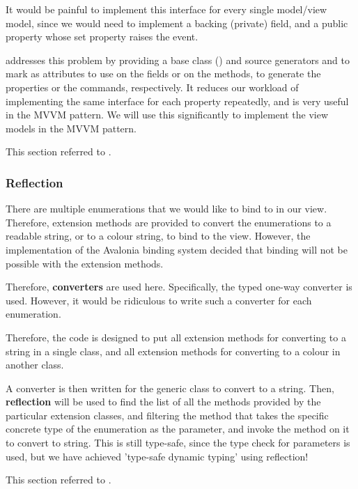 It would be painful to implement this interface for every single model/view model, since we would need to implement a backing (private) field, and a public property whose set property raises the  event.

 addresses this problem by providing a base class () and source generators  and  to mark as attributes to use on the fields or on the methods, to generate the properties or the commands, respectively. It reduces our workload of implementing the same interface for each property repeatedly, and is very useful in the MVVM pattern. We will use this significantly to implement the view models in the MVVM pattern.

This section referred to \autocite{dotnet-tutorial-mvvm-toolkit}.

\subsubsection{Reflection}

There are multiple enumerations that we would like to bind to in our view. Therefore, extension methods are provided to convert the enumerations to a readable string, or to a colour string, to bind to the view. However, the implementation of the Avalonia binding system decided that binding will not be possible with the extension methods.

Therefore, \textbf{converters} are used here. Specifically, the typed one-way converter  is used. However, it would be ridiculous to write such a converter for each enumeration.

Therefore, the code is designed to put all extension methods for converting to a string in a single class, and all extension methods for converting to a colour in another class.

A converter is then written for the generic  class to convert to a string. Then, \textbf{reflection} will be used to find the list of all the methods provided by the particular extension classes, and filtering the method that takes the specific concrete type of the enumeration as the parameter, and invoke the method on it to convert to string. This is still type-safe, since the type check for parameters is used, but we have achieved 'type-safe dynamic typing' using reflection!

This section referred to \autocite{avalonia-custom-converter,dotnet-reference-getmethods, dotnet-reference-getmethods, dotnet-reference-bindingflags}.

